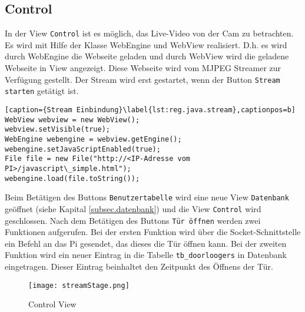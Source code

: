 \subsection{Control}
\label{subsec.control}

In der View \texttt{Control} ist es möglich, das Live-Video von der Cam zu betrachten. Es wird mit Hilfe der Klasse WebEngine und WebView realisiert. D.h. es wird durch WebEngine die Webseite geladen und durch WebView wird die geladene Webseite in View angezeigt. Diese Webseite wird vom MJPEG Streamer zur Verfügung gestellt. Der Stream wird erst gestartet, wenn der Button \texttt{Stream starten} getätigt ist.

\begin{lstlisting}[caption={Stream Einbindung}\label{lst:reg.java.stream},captionpos=b]
WebView webview = new WebView();
webview.setVisible(true);
WebEngine webengine = webview.getEngine();
webengine.setJavaScriptEnabled(true);
File file = new File("http://<IP-Adresse vom PI>/javascript\_simple.html");
webengine.load(file.toString());
\end{lstlisting}

Beim Betätigen des Buttons \texttt{Benutzertabelle} wird eine neue View \texttt{Datenbank} geöffnet (siehe Kapital \ref{subsec.datenbank}) und die View \texttt{Control} wird geschlossen. 
Nach dem Betätigen des Buttons \texttt{Tür öffnen} werden zwei Funktionen aufgerufen. Bei der ersten Funktion wird über die Socket-Schnittstelle ein Befehl an das Pi gesendet, das dieses die Tür öffnen kann. Bei der zweiten Funktion wird ein neuer Eintrag in die Tabelle \texttt{tb\_doorloogers} in Datenbank eingetragen. Dieser Eintrag beinhaltet den Zeitpunkt des Öffnens der Tür.


\begin{figure}[h]
  \begin{center}
    \texttt{[image: streamStage.png]}
  		  \caption{Control View}
     \label{fig.StreamFenster}
  \end{center}
\end{figure}

